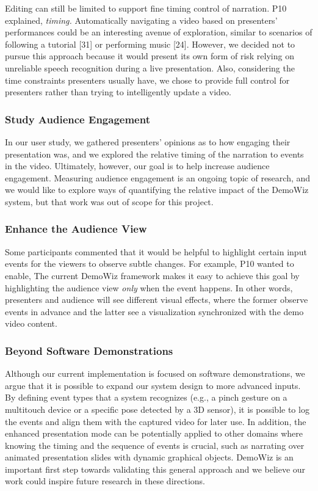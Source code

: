 Editing can still be limited to support fine timing control of narration. P10 explained,  \textit{timing.} Automatically navigating a video based on presenters’ performances could be an interesting avenue of exploration, similar to scenarios of following a tutorial [31] or performing music [24]. However, we decided not to pursue this approach because it would present its own form of risk relying on unreliable speech recognition during a live presentation. Also, considering the time constraints presenters usually have, we chose to provide full control for presenters rather than trying to intelligently update a video.

\subsubsection{Study Audience Engagement}
In our user study, we gathered presenters’ opinions as to how engaging their presentation was, and we explored the relative timing of the narration to events in the video. Ultimately, however, our goal is to help increase audience engagement. Measuring audience engagement is an ongoing topic of research, and we would like to explore ways of quantifying the relative impact of the DemoWiz system, but that work was out of scope for this project.

\subsubsection{Enhance the Audience View}
Some participants commented that it would be helpful to highlight certain input events for the viewers to observe subtle changes. For example, P10 wanted to enable,  The current DemoWiz framework makes it easy to achieve this goal by highlighting the audience view \textit{only} when the event happens. In other words, presenters and audience will see different visual effects, where the former observe events in advance and the latter see a visualization synchronized with the demo video content.

\subsubsection{Beyond Software Demonstrations}
Although our current implementation is focused on software demonstrations, we argue that it is possible to expand our system design to more advanced inputs. By defining event types that a system recognizes (e.g., a pinch gesture on a multitouch device or a specific pose detected by a 3D sensor), it is possible to log the events and align them with the captured video for later use. In addition, the enhanced presentation mode can be potentially applied to other domains where knowing the timing and the sequence of events is crucial, such as narrating over animated presentation slides with dynamic graphical objects. DemoWiz is an important first step towards validating this general approach and we believe our work could inspire future research in these directions.
